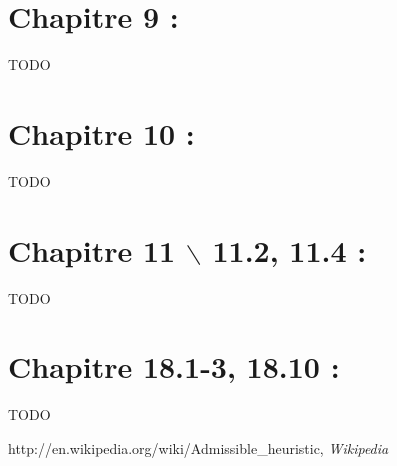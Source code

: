 \section{Chapitre 9 : }
TODO

\section{Chapitre 10 : }
TODO

\section{Chapitre 11 $\backslash$ 11.2, 11.4 : }
TODO

\section{Chapitre 18.1-3, 18.10 : }
TODO


\begin{thebibliography}{1}
 http://en.wikipedia.org/wiki/Admissible\_heuristic, {\em Wikipedia}
\end{thebibliography}


